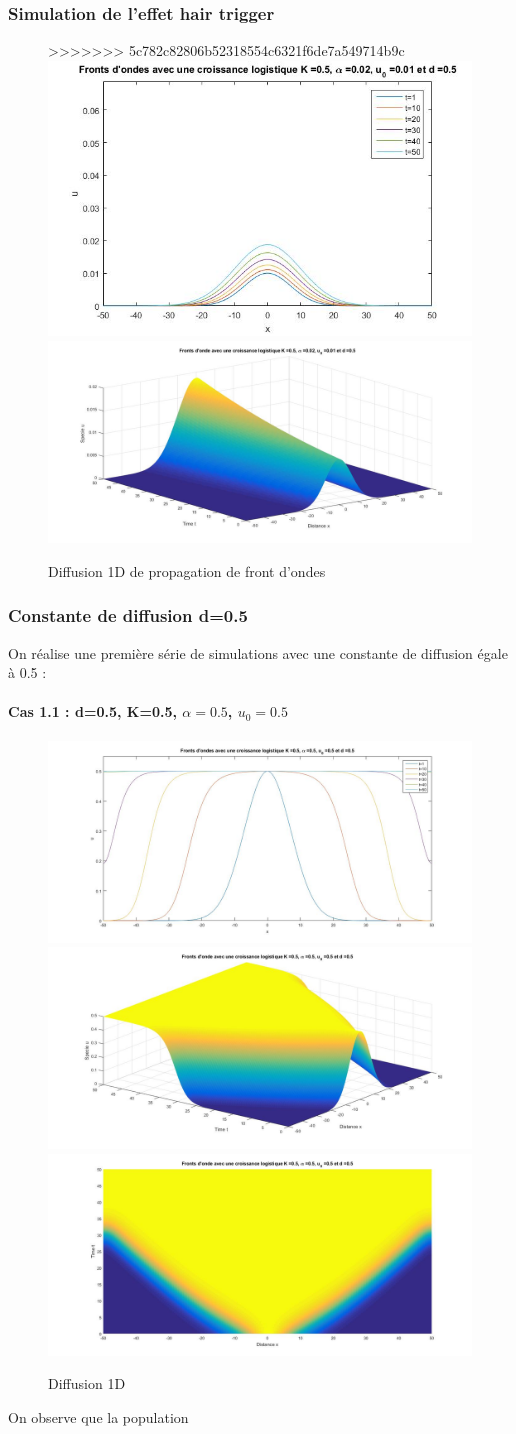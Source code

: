 \documentclass[a4paper,11pt]{article}
\begin{document}
\subsubsection{Simulation de l'effet hair trigger}
\begin{figure}[H]
>>>>>>> 5c782c82806b52318554c6321f6de7a549714b9c
	\centering
	\includegraphics[width=0.45\linewidth]{SimulationKPP/Trigger/Fig2}\hfill
	\includegraphics[width=0.55\linewidth]{SimulationKPP/Trigger/fig1}\hfill
	\caption{Diffusion 1D de propagation de front d'ondes}
\end{figure}
\noindent


\subsubsection{Constante de diffusion d=0.5}
On réalise une première série de simulations avec une constante de diffusion égale à 0.5 :
\paragraph{Cas 1.1 : d=0.5, K=0.5, $\alpha =0.5$, $u_0=0.5$}
\noindent
\begin{figure}[H]
	\centering
	\includegraphics[width=0.45\linewidth]{SimulationKPP/KPP11}\hfill
	\includegraphics[width=0.45\linewidth]{SimulationKPP/KPP12.jpg}
    \includegraphics[width=0.45\linewidth]{SimulationKPP/KPP14.jpg}
    \caption{Diffusion 1D}
\end{figure}
\noindent
On observe que la population 
\end{document}
